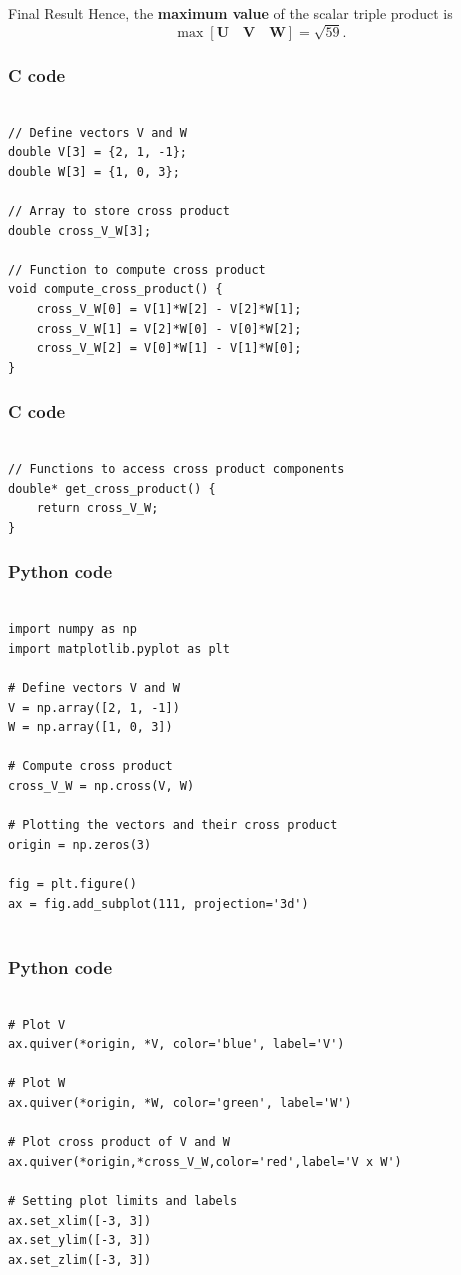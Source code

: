 \documentclass{beamer}
\let\vec\mathbf
\providecommand{\sbrak}[1]{\ensuremath{{}\left[#1\right]}}
\theoremstyle{remark}
\begin{document}
\begin{frame}{Final Result}
    Hence, the \textbf{maximum value} of the scalar triple product is
    \begin{equation}
    \boxed{
    \max \sbrak{\vec{U} \quad \vec{V} \quad \vec{W}} = \sqrt{59}.
    }
    \label{eq:final_answer}
    \end{equation}
\end{frame}


\begin{frame}[fragile]
\frametitle{C code}
\begin{lstlisting}

// Define vectors V and W
double V[3] = {2, 1, -1};
double W[3] = {1, 0, 3};

// Array to store cross product
double cross_V_W[3];

// Function to compute cross product
void compute_cross_product() {
    cross_V_W[0] = V[1]*W[2] - V[2]*W[1];
    cross_V_W[1] = V[2]*W[0] - V[0]*W[2];
    cross_V_W[2] = V[0]*W[1] - V[1]*W[0];
}

\end{lstlisting}
\end{frame}


\begin{frame}[fragile]
\frametitle{C code}
\begin{lstlisting}

// Functions to access cross product components
double* get_cross_product() {
    return cross_V_W;
}

\end{lstlisting}
\end{frame}

\begin{frame}[fragile]
\frametitle{Python code}
\begin{lstlisting}

import numpy as np
import matplotlib.pyplot as plt

# Define vectors V and W
V = np.array([2, 1, -1])
W = np.array([1, 0, 3])

# Compute cross product
cross_V_W = np.cross(V, W)

# Plotting the vectors and their cross product
origin = np.zeros(3)

fig = plt.figure()
ax = fig.add_subplot(111, projection='3d')


\end{lstlisting}
\end{frame}


\begin{frame}[fragile]
\frametitle{Python code}
\begin{lstlisting}

# Plot V
ax.quiver(*origin, *V, color='blue', label='V')

# Plot W
ax.quiver(*origin, *W, color='green', label='W')

# Plot cross product of V and W
ax.quiver(*origin,*cross_V_W,color='red',label='V x W')

# Setting plot limits and labels
ax.set_xlim([-3, 3])
ax.set_ylim([-3, 3])
ax.set_zlim([-3, 3])


\end{lstlisting}
\end{frame}
\end{document}
